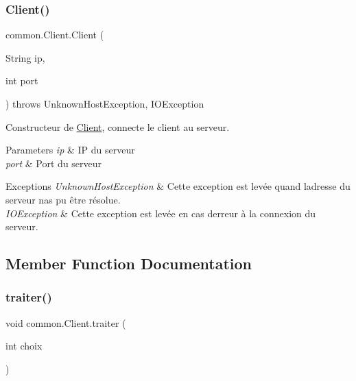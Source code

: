 \subsubsection{\texorpdfstring{Client()}{Client()}}
{\footnotesize\ttfamily common.\+Client.\+Client (\begin{DoxyParamCaption}\item[{String}]{ip,  }\item[{int}]{port }\end{DoxyParamCaption}) throws Unknown\+Host\+Exception, I\+O\+Exception\hspace{0.3cm}{\ttfamily [inline]}}



Constructeur de \hyperlink{classcommon_1_1Client}{Client}, connecte le client au serveur. 


\begin{DoxyParams}{Parameters}
{\em ip} & IP du serveur \\
\hline
{\em port} & Port du serveur \\
\hline
\end{DoxyParams}

\begin{DoxyExceptions}{Exceptions}
{\em Unknown\+Host\+Exception} & Cette exception est levée quand l\textquotesingle{}adresse du serveur n\textquotesingle{}as pu être résolue. \\
\hline
{\em I\+O\+Exception} & Cette exception est levée en cas d\textquotesingle{}erreur à la connexion du serveur. \\
\hline
\end{DoxyExceptions}


\subsection{Member Function Documentation}
\mbox{\label{classcommon_1_1Client_a9e906ef13cae3b0be8c8899c2005d0d6}} 
\subsubsection{\texorpdfstring{traiter()}{traiter()}}
{\footnotesize\ttfamily void common.\+Client.\+traiter (\begin{DoxyParamCaption}\item[{int}]{choix }\end{DoxyParamCaption})\hspace{0.3cm}{\ttfamily [inline]}}



